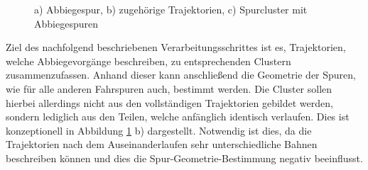 \begin{figure}[H]
    \centering
    \qquad
    \qquad
    \caption{a) Abbiegespur, b) zugehörige Trajektorien, c) Spurcluster mit Abbiegespuren}
    \label{fig:real_turning_lane}
\end{figure}

Ziel des nachfolgend beschriebenen Verarbeitungsschrittes ist es, Trajektorien, welche Abbiegevorgänge
beschreiben, zu entsprechenden Clustern zusammenzufassen. Anhand dieser kann anschließend die Geometrie
der Spuren, wie für alle anderen Fahrspuren auch, bestimmt werden.
Die Cluster sollen hierbei allerdings nicht aus den vollständigen Trajektorien gebildet werden, sondern
lediglich aus den Teilen, welche anfänglich identisch verlaufen. Dies ist konzeptionell in Abbildung
\ref{fig:real_turning_lane} b) dargestellt. Notwendig ist dies, da die Trajektorien nach dem Auseinanderlaufen
sehr unterschiedliche Bahnen beschreiben können und dies die Spur-Geometrie-Bestimmung negativ beeinflusst.

